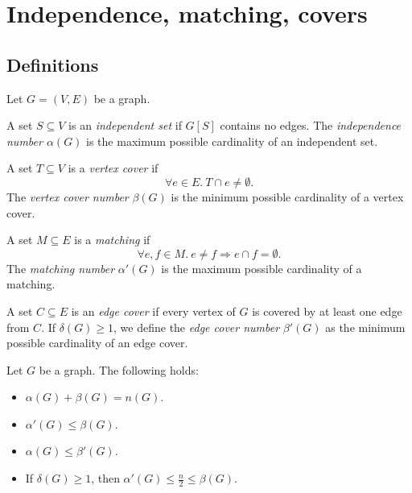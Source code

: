 \section{Independence, matching, covers}

\subsection{Definitions}


Let $G = (V, E)$ be a graph.

\begin{definition}
    A set $S \subseteq V$ is an \emph{independent set} if $G[S]$ contains no edges.
    The \emph{independence number $\alpha(G)$} is the maximum possible cardinality of an independent set.
\end{definition}

\begin{definition}
    A set $T \subseteq V$ is a \emph{vertex cover} if 
    \[
        \forall e \in E.~T\cap e \neq \emptyset.
    \]
    The \emph{vertex cover number} $\beta(G)$ is the minimum 
    possible cardinality of a vertex cover.
\end{definition}

\begin{definition}
    A set $M \subseteq E$ is a \emph{matching} if
    \[
        \forall e,f \in M.~e \neq f \Rightarrow e \cap f = \emptyset.
    \]
    The \emph{matching number} $\alpha'(G)$ is 
    the maximum possible cardinality of a matching.
\end{definition}

\begin{definition}
    A set $C \subseteq E$ is an \emph{edge cover} if every vertex of $G$ is covered 
    by at least one edge from $C$. If $\delta(G) \ge 1$, we define the 
    \emph{edge cover number} $\beta'(G)$ as 
    the minimum possible cardinality of an edge cover.
\end{definition}

\begin{lemma}
    Let $G$ be a graph. The following holds:
    \begin{itemize}
        \item $\alpha(G) + \beta(G) = n(G)$.
        \item $\alpha'(G) \le \beta(G)$.
        \item $\alpha(G) \le \beta'(G)$.
        \item If $\delta(G) \ge 1$, then $\alpha'(G) \le \frac{n}{2} \le \beta(G)$.
    \end{itemize}
\end{lemma}

